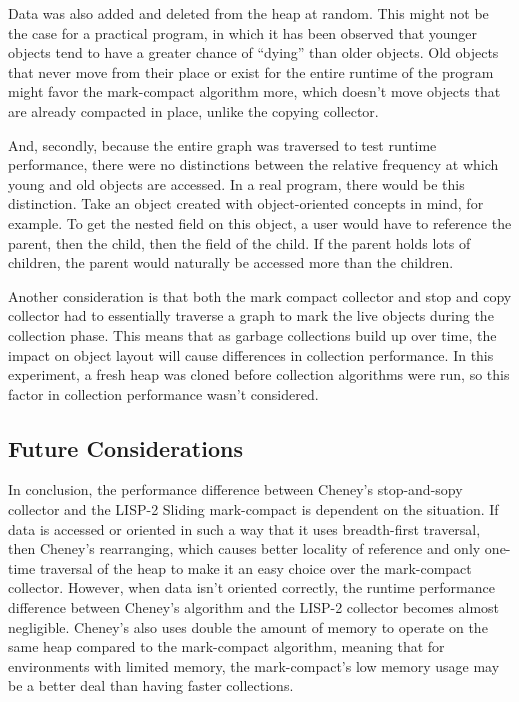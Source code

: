 \documentclass[index]{subfiles}
\begin{document}
Data was also added and deleted from the heap at random. This might not be the case for a practical program, in which it has been observed that younger objects tend to have a greater chance of ``dying'' than older objects\cite{youtube_introductory_video}. Old objects that never move from their place or exist for the entire runtime of the program might favor the mark-compact algorithm more, which doesn't move objects that are already compacted in place, unlike the copying collector.

And, secondly, because the entire graph was traversed to test runtime performance, there were no distinctions between the relative frequency at which young and old objects are accessed. In a real program, there would be this distinction. Take an object created with object-oriented concepts in mind, for example. To get the nested field on this object, a user would have to reference the parent, then the child, then the field of the child. If the parent holds lots of children, the parent would naturally be accessed more than the children.


Another consideration is that both the mark compact collector and stop and copy collector had to essentially traverse a graph to mark the live objects during the collection phase. This means that as garbage collections build up over time, the impact on object layout will cause differences in collection performance. In this experiment, a fresh heap was cloned before collection algorithms were run, so this factor in collection performance wasn't considered.

\subsection{Future Considerations}

In conclusion, the performance difference between Cheney's stop-and-sopy collector and the LISP-2 Sliding mark-compact is dependent on the situation. If data is accessed or oriented in such a way that it uses breadth-first traversal, then Cheney's rearranging, which causes better locality of reference and only one-time traversal of the heap to make it an easy choice over the mark-compact collector. However, when data isn't oriented correctly, the runtime performance difference between Cheney's algorithm and the LISP-2 collector becomes almost negligible. Cheney's also uses double the amount of memory to operate on the same heap compared to the mark-compact algorithm, meaning that for environments with limited memory, the mark-compact's low memory usage may be a better deal than having faster collections.
\end{document}
